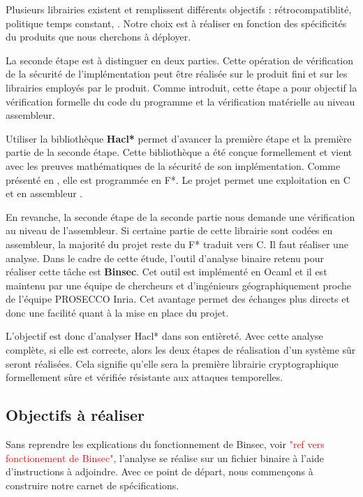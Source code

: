 Plusieurs librairies existent \cite{OpenSSL, BearSSL, polubelova2020haclxn} et remplissent différents objectifs :  rétrocompatiblité, politique temps constant, \etc. Notre choix est à réaliser en fonction des spécificités du produits que nous cherchons à déployer.\medbreak

La seconde étape est à distinguer en deux parties. Cette opération de vérification de la sécurité de l'implémentation peut être réalisée sur le produit fini et sur les librairies employés par le produit. Comme introduit, cette étape a pour objectif la vérification formelle du code du programme et la vérification matérielle au niveau assembleur.\medbreak

Utiliser la bibliothèque \textbf{Hacl*} \cite{polubelova2020haclxn, Hacl*} permet d'avancer la première étape et la première partie de la seconde étape. Cette bibliothèque a été conçue formellement et vient avec les preuves mathématiques de la sécurité de son implémentation. Comme présenté en , elle est programmée en F*. Le projet permet une exploitation en C et en assembleur \cite{Hacl*}.\medbreak

En revanche, la seconde étape de la seconde partie nous demande une vérification au niveau de l'assembleur. Si certaine partie de cette librairie sont codées en assembleur, la majorité du projet reste du F* traduit vers C. Il faut réaliser une analyse. Dans le cadre de cette étude, l'outil d'analyse binaire retenu pour réaliser cette tâche est \textbf{Binsec}. Cet outil est implémenté en Ocaml et il est maintenu par une équipe de chercheurs et d'ingénieurs géographiquement proche de l'équipe PROSECCO Inria. Cet avantage permet des échanges plus directs et donc une facilité quant à la mise en place du projet.\medbreak

L'objectif est donc d'analyser Hacl* dans son entièreté. Avec cette analyse complète, si elle est correcte, alors les deux étapes de réalisation d'un système sûr seront réalisées. Cela signifie qu'elle sera la première librairie cryptographique formellement sûre et vérifiée résistante aux attaques temporelles.

\subsection*{Objectifs à réaliser}

Sans reprendre les explications du fonctionnement de Binsec, voir \textcolor{red}{"ref vers fonctionement de Binsec"}, l'analyse se réalise sur un fichier binaire à l'aide d'instructions à adjoindre. Avec ce point de départ, nous commençons à construire notre carnet de spécifications.

